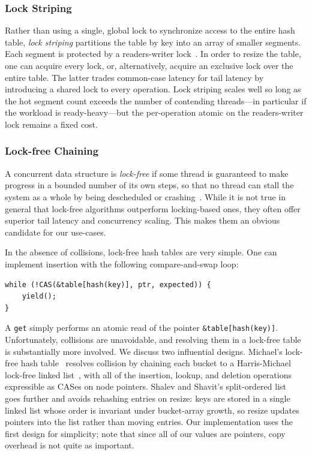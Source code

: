 \subsubsection{Lock Striping}
Rather than using a single, global lock to synchronize access to the entire hash
table, \emph{lock striping} partitions the table by key into an array of smaller
segments. Each segment is protected by a readers-writer
lock~\cite{herlihy20art}. In order to resize the table, one can acquire every
lock, or, alternatively, acquire an exclusive lock over the entire table. The
latter trades common-case latency for tail latency by introducing a shared
lock to every operation. Lock striping scales well so long as the hot segment
count exceeds the number of contending threads---in particular if the workload
is ready-heavy---but the per-operation atomic on the readers-writer lock remains
a fixed cost.

\subsubsection{Lock-free Chaining}
A concurrent data structure is \emph{lock-free} if some thread is guaranteed to
make progress in a bounded number of its own steps, so that no thread can stall
the system as a whole by being descheduled or crashing~\cite{herlihy91waitfree}.
While it is not true in general that lock-free algorithms outperform
locking-based ones, they often offer superior tail latency and concurrency
scaling. This makes them an obvious candidate for our use-cases.

In the absence of collisions, lock-free hash tables are very simple. One can
implement insertion with the following compare-and-swap loop:
\begin{verbatim}
while (!CAS(&table[hash(key)], ptr, expected)) {
    yield();
}
\end{verbatim}

A \texttt{get} simply performs an atomic read of the pointer
\texttt{\&table[hash(key)]}. Unfortunately, collisions are unavoidable, and
resolving them in a lock-free table is substantially more involved. We discuss
two influential designs. Michael's lock-free hash table~\cite{michael02highperf}
resolves collision by chaining each bucket to a Harris-Michael lock-free linked
list~\cite{harris01lockfree}, with all of the insertion, lookup, and deletion
operations expressible as CASes on node pointers. Shalev and Shavit's
split-ordered list~\cite{shalev06splitorder} goes further and avoids rehashing
entries on resize: keys are stored in a single linked list whose order is
invariant under bucket-array growth, so resize updates pointers into the list
rather than moving entries. Our implementation uses the first design for
simplicity; note that since all of our values are pointers, copy overhead is not
quite as important.

